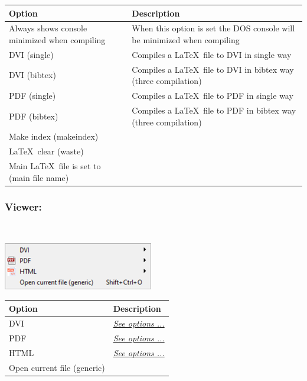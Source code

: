 \begin{scriptsize}
  \begin{tabularx}{\textwidth}{>{\hsize=0.5\hsize}X>{\hsize=0.7\hsize}X}\\
    \hline
    \textbf{Option} & \textbf{Description} \\
    \hline
    Always shows console minimized when compiling & When this option is set the DOS
     console will be minimized when compiling \\
    \hdashline[1pt/1pt]
    DVI (single) & Compiles a \LaTeX ~file to DVI in single way \\
    DVI (bibtex) & Compiles a \LaTeX ~file to DVI in bibtex way (three compilation) \\
    \hdashline[1pt/1pt]
    PDF (single) & Compiles a \LaTeX ~file to PDF in single way \\
    PDF (bibtex) & Compiles a \LaTeX ~file to PDF in bibtex way (three compilation) \\
    \hdashline[1pt/1pt]
    Make index (makeindex) \\
    \LaTeX ~clear (waste) \\
    Main \LaTeX ~file is set to (main file name) \\
    \hline
  \end{tabularx}
\end{scriptsize}


\hypertarget{menu_tools_processing_viewer}{}
\subsubsection{Viewer:}\\

\includegraphics[scale=0.8]{./res/menu_tools_processing_viewer.png}\\

\begin{scriptsize}
  \begin{tabularx}{\textwidth}{>{\hsize=0.3\hsize}X>{\hsize=0.7\hsize}X}\\
    \hline
    \textbf{Option} & \textbf{Description} \\
    \hline
    DVI  & \textit{\href{\#menu\_tools\_processing\_viewer\_DVI}{See options ...}} \\
    PDF  & \textit{\href{\#menu\_tools\_processing\_viewer\_pdf}{See options ...}} \\
    HTML & \textit{\href{\#menu\_tools\_processing\_viewer\_html}{See options ...}} \\
    Open current file (generic) \\
    \hline
  \end{tabularx}
\end{scriptsize}


